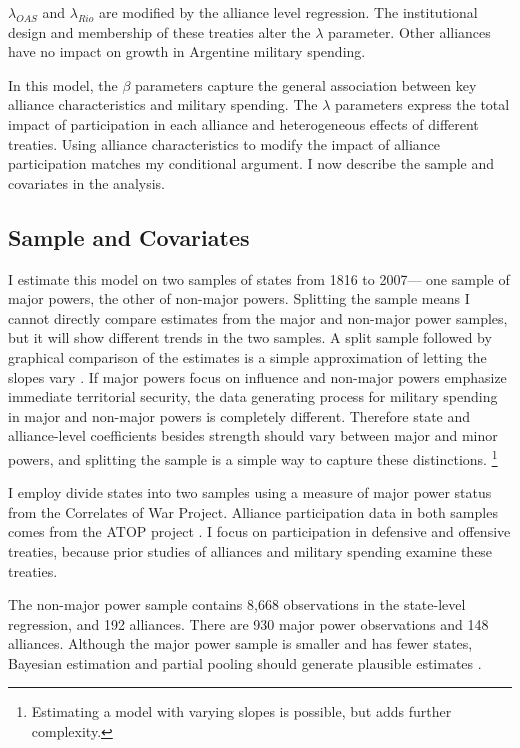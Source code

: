 \documentclass[12pt]{article}
\begin{document}
$\lambda_{OAS}$ and $\lambda_{Rio}$ are modified by the alliance level regression. 
The institutional design and membership of these treaties alter the $\lambda$ parameter.
Other alliances have no impact on growth in Argentine military spending. 


In this model, the $\beta$ parameters capture the general association between key alliance characteristics and military spending. 
The $\lambda$ parameters express the total impact of participation in each alliance and heterogeneous effects of different treaties. 
Using alliance characteristics to modify the impact of alliance participation matches my conditional argument. 
I now describe the sample and covariates in the analysis.  



\subsection{Sample and Covariates} 

I estimate this model on two samples of states from 1816 to 2007--- one sample of major powers, the other of non-major powers. 
Splitting the sample means I cannot directly compare estimates from the major and non-major power samples, but it will show different trends in the two samples. 
A split sample followed by graphical comparison of the estimates is a simple approximation of letting the slopes vary \citep{GelmanHill2007}. If major powers focus on influence and non-major powers emphasize immediate territorial security, the data generating process for military spending in major and non-major powers is completely different.
Therefore state and alliance-level coefficients besides strength should vary between major and minor powers, and splitting the sample is a simple way to capture these distinctions.
\footnote{Estimating a model with varying slopes is possible, but adds further complexity.} 



I employ divide states into two samples using a measure of major power status from the Correlates of War Project. 
Alliance participation data in both samples comes from the ATOP project \citep{Leedsetal2002}. 
I focus on participation in defensive and offensive treaties, because prior studies of alliances and military spending examine these treaties. 


The non-major power sample contains 8,668 observations in the state-level regression, and 192 alliances. 
There are 930 major power observations and 148 alliances. 
Although the major power sample is smaller and has fewer states, Bayesian estimation and partial pooling should generate plausible estimates \citep{Stegmueller2013}. 
\end{document}
